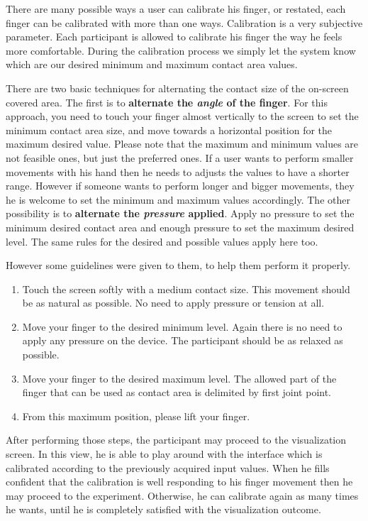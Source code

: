 There are many possible ways a user can calibrate his finger, or restated, each finger can be calibrated with more than one ways. Calibration is a very subjective parameter. Each participant is allowed to calibrate his finger the way he feels more comfortable. During the calibration process we simply let the system know which are our desired minimum and maximum contact area values. 


There are two basic techniques for alternating the contact size of the on-screen covered area. The first is to \textbf{alternate the \textit{angle} of the finger}. For this approach, you need to touch your finger almost vertically to the screen to set the minimum contact area size, and move towards a horizontal position for the maximum desired value. Please note that the maximum and minimum values are not feasible ones, but just the preferred ones. If a user wants to perform smaller movements with his hand then he needs to adjusts the values to have a shorter range. However if someone wants to perform longer and bigger movements, they he is welcome to set the minimum and maximum values accordingly. 
The other possibility is to \textbf{alternate the \textit{pressure} applied}.  Apply no pressure to set the minimum desired contact area and enough pressure to set the maximum desired level. The same rules for the desired and possible values apply here too.



However some guidelines were given to them, to help them perform it properly.
\begin{enumerate}
	\item Touch the screen softly with a medium contact size. This movement should be as natural as possible. No need to apply pressure or tension at all.
	\item Move your finger to the desired minimum level. Again there is no need to apply any pressure on the device. The participant should be as relaxed as possible.
	\item Move your finger to the desired maximum level. The allowed part of the finger that can be used as contact area is delimited by first joint point. 
	\item From this maximum position, please lift your finger. 
\end{enumerate}

After performing those steps, the participant may proceed to the visualization screen. In this view, he is able to play around with the interface which is calibrated according to the previously acquired input values. When he fills confident that the calibration is well responding to his finger movement then he may proceed to the experiment. Otherwise, he can calibrate again as many times he wants, until he is completely satisfied with the visualization outcome.

